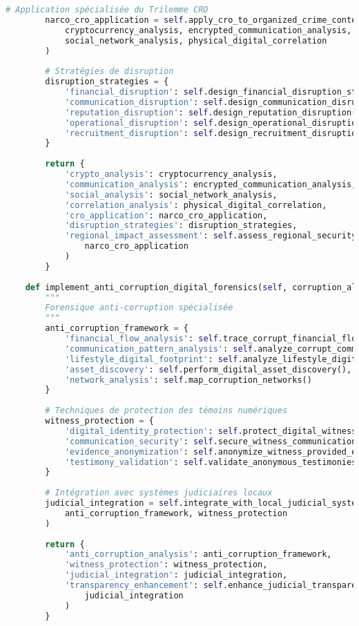 \begin{lstlisting}[language=Python, caption=Investigation narcotrafic numérique transfrontalier]
        # Application spécialisée du Trilemme CRO
        narco_cro_application = self.apply_cro_to_organized_crime_context(
            cryptocurrency_analysis, encrypted_communication_analysis,
            social_network_analysis, physical_digital_correlation
        )
        
        # Stratégies de disruption
        disruption_strategies = {
            'financial_disruption': self.design_financial_disruption_strategies(),
            'communication_disruption': self.design_communication_disruption(),
            'reputation_disruption': self.design_reputation_disruption(),
            'operational_disruption': self.design_operational_disruption(),
            'recruitment_disruption': self.design_recruitment_disruption()
        }
        
        return {
            'crypto_analysis': cryptocurrency_analysis,
            'communication_analysis': encrypted_communication_analysis,
            'social_analysis': social_network_analysis,
            'correlation_analysis': physical_digital_correlation,
            'cro_application': narco_cro_application,
            'disruption_strategies': disruption_strategies,
            'regional_impact_assessment': self.assess_regional_security_impact(
                narco_cro_application
            )
        }
    
    def implement_anti_corruption_digital_forensics(self, corruption_allegations):
        """
        Forensique anti-corruption spécialisée
        """
        anti_corruption_framework = {
            'financial_flow_analysis': self.trace_corrupt_financial_flows(),
            'communication_pattern_analysis': self.analyze_corrupt_communication_patterns(),
            'lifestyle_digital_footprint': self.analyze_lifestyle_digital_inconsistencies(),
            'asset_discovery': self.perform_digital_asset_discovery(),
            'network_analysis': self.map_corruption_networks()
        }
        
        # Techniques de protection des témoins numériques
        witness_protection = {
            'digital_identity_protection': self.protect_digital_witness_identities(),
            'communication_security': self.secure_witness_communications(),
            'evidence_anonymization': self.anonymize_witness_provided_evidence(),
            'testimony_validation': self.validate_anonymous_testimonies()
        }
        
        # Intégration avec systèmes judiciaires locaux
        judicial_integration = self.integrate_with_local_judicial_systems(
            anti_corruption_framework, witness_protection
        )
        
        return {
            'anti_corruption_analysis': anti_corruption_framework,
            'witness_protection': witness_protection,
            'judicial_integration': judicial_integration,
            'transparency_enhancement': self.enhance_judicial_transparency(
                judicial_integration
            )
        }
\end{lstlisting}

